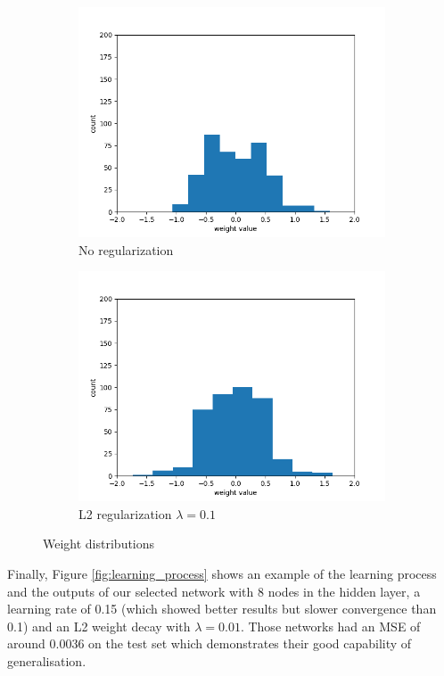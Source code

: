 \documentclass[a4paper]{article}
\begin{document}
\begin{figure}[hb]
	\begin{subfigure}{.5\linewidth}
		\includegraphics[width=.6\linewidth]{img/4_1_weight_histogram_0.png}
		\centering
		\caption{\small No regularization}
	\end{subfigure}
	\begin{subfigure}{.5\linewidth}
		\centering
		\includegraphics[width=.6\linewidth]{img/4_1_weight_histogram_0_1.png}
		\caption{\small L2 regularization $\lambda = 0.1$}
	\end{subfigure}
	\caption{Weight distributions}
	\label{fig:weight_histogram}
\end{figure}

Finally, Figure \ref{fig:learning_process} shows an example of the learning process and the outputs of our selected network with 8 nodes in the hidden layer, a learning rate of 0.15 (which showed better results but slower convergence than 0.1) and an L2 weight decay with $\lambda = 0.01$. Those networks had an MSE of around 0.0036 on the test set which demonstrates their good capability of generalisation.
\end{document}
